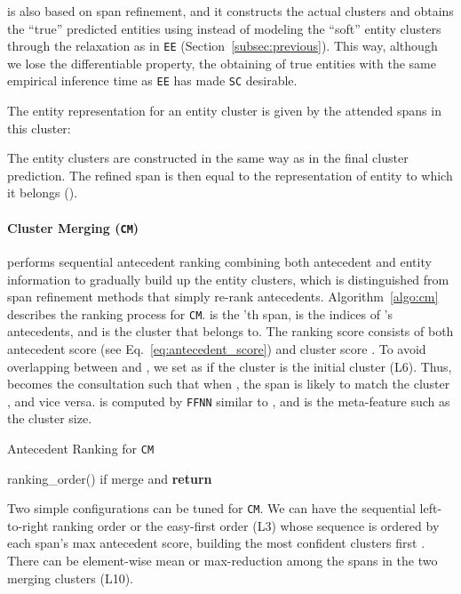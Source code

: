\documentclass[11pt,a4paper]{article}
\newcommand\CM{\texttt{CM}}
\begin{document}
is also based on span refinement, and it
constructs the actual clusters and obtains the ``true'' predicted entities using  instead of modeling the ``soft'' entity clusters through the relaxation as in \texttt{EE} (Section~\ref{subsec:previous}).
This way, although we lose the differentiable property, the obtaining of true entities with the same empirical inference time as \texttt{EE} has made \texttt{SC} desirable.

\noindent The entity representation  for an entity cluster  is given by the attended spans in this cluster:

The entity clusters  are constructed in the same way as in the final cluster prediction. 
The refined span  is then equal to the representation of entity  to which it belongs ().

\paragraph{Cluster Merging (\texttt{CM})}

performs sequential antecedent ranking combining both antecedent and entity information to gradually build up the entity clusters, which is distinguished from span refinement methods that simply re-rank antecedents.
Algorithm~\ref{algo:cm} describes the ranking process for \texttt{CM}. 
 is the 'th span,  is the indices of 's antecedents, and  is the cluster that  belongs to.
The ranking score   consists of both antecedent score  (see Eq.~\ref{eq:antecedent_score}) and cluster score .
To avoid overlapping between  and , we set  as  if the cluster is the initial cluster (L6). 
Thus,  becomes the consultation such that when , the span  is likely to match the cluster , and vice versa. 
 is computed by \texttt{FFNN} similar to , and  is the meta-feature such as the cluster size.

\begin{algorithm}
  \caption{Antecedent Ranking for \CM}\label{algo:cm}
  \begin{algorithmic}[1]
    \small
    \State 
    \State  ranking\_order()
    \For{}
        \For{} 
            \State  if 
            \State 
        \EndFor
        \State 
        \If{}
            \State merge  and 
        \EndIf
    \EndFor
    \State \textbf{return} 
    \EndProcedure
  \end{algorithmic}
\end{algorithm}

\noindent Two simple configurations can be tuned for \texttt{CM}. We can have the sequential left-to-right ranking order or the easy-first order (L3) whose sequence is ordered by each span's max antecedent score, building the most confident clusters first \citep{ng-cardie-2002-improving,clark-manning-2016-improving}. There can be element-wise mean or max-reduction among the spans in the two merging clusters (L10).
\end{document}
